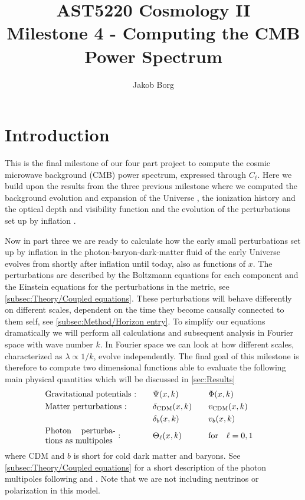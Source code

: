 \documentclass[10pt,a4paper]{article}
\title{AST5220 Cosmology \rm{II}\\ 
\vspace{5mm}Milestone 4 - Computing the CMB Power Spectrum}
\author{Jakob Borg}
\providecommand{\rCDM}
{\ensuremath{
\textrm{CDM}
}
}
\begin{document}
\maketitle
{}

\section{Introduction}
\label{sec:Introduction}
This is the final milestone of our four part project to compute the cosmic microwave background (CMB) power spectrum, expressed through $C_\ell$. Here we build upon the results from the three previous milestone where we computed the background evolution and expansion of the Universe \citep{milestone1}, the ionization history and the optical depth and visibility function \citep{milestone2} and the evolution of the perturbations set up by inflation \citep{milestone3}.



Now in part three we are ready to calculate how the early small perturbations set up by inflation in the photon-baryon-dark-matter fluid of the early Universe evolves from shortly after inflation until today, also as functions of $x$. The perturbations are described by the Boltzmann equations for each component and the Einstein equations for the perturbations in the metric, see \cref{subsec:Theory/Coupled equations}. These perturbations will behave differently on different scales, dependent on the time they become causally connected to them self, see \cref{subsec:Method/Horizon entry}. To simplify our equations dramatically we will perform all calculations and subsequent analysis in Fourier space with wave number $k$. In Fourier space we can look at how different scales, characterized as $\lambda \propto 1/k$, evolve independently. The final goal of this milestone is therefore to compute two dimensional functions able to evaluate the following main physical quantities which will be discussed in \cref{sec:Results}
\begin{alignat*}{4}
& \text{Gravitational potentials :} &\quad& \Psi(x,k) &\quad& \Phi(x,k) &
\\
& \text{Matter perturbations :}     &\quad& \delta_{\rCDM}(x,k) &\quad& v_{\rCDM}(x,k) &
\\
&                                  &\quad& \delta_{b}(x,k) &\quad& v_{b}(x,k) &
\\
& \text{\parbox{3cm}{Photon perturbations as multipoles} :}
                                &\quad& \Theta_\ell(x,k) &\quad& \qfor* \ell = {0,1}&
\end{alignat*}%
where \rm{CDM} and $b$ is short for cold dark matter and baryons. See \cref{subsec:Theory/Coupled equations} for a short description of the photon multipoles following \cite{Calin} and \cite{Dodelson}.  Note that we are not including neutrinos or polarization in this model.
\end{document}
